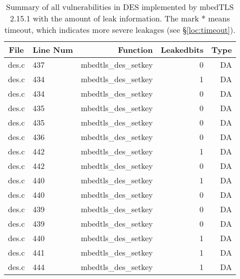 \begin{table}%
\centering\tiny\scriptsize
\caption{Summary of all vulnerabilities in DES implemented by mbedTLS 2.15.1 with the amount of leak information. The mark $*$ means timeout, which indicates more severe leakages (see \S\ref{loc:timeout}).}\label{tab:DESmbedTLS}
\begin{tabular}{clrrr}
\hline
\textbf{File} & \textbf{Line Num} & \textbf{Function} & \textbf{Leakedbits} & \textbf{Type} \\\hline
des.c& 437&mbedtls\_des\_setkey&0 &DA\\
des.c& 434&mbedtls\_des\_setkey&1 &DA\\
des.c& 434&mbedtls\_des\_setkey&0 &DA\\
des.c& 435&mbedtls\_des\_setkey&0 &DA\\
des.c& 435&mbedtls\_des\_setkey&0 &DA\\
des.c& 436&mbedtls\_des\_setkey&0 &DA\\
des.c& 442&mbedtls\_des\_setkey&1 &DA\\
des.c& 442&mbedtls\_des\_setkey&0 &DA\\
des.c& 440&mbedtls\_des\_setkey&1 &DA\\
des.c& 440&mbedtls\_des\_setkey&0 &DA\\
des.c& 439&mbedtls\_des\_setkey&0 &DA\\
des.c& 439&mbedtls\_des\_setkey&0 &DA\\
des.c& 440&mbedtls\_des\_setkey&1 &DA\\
des.c& 441&mbedtls\_des\_setkey&1 &DA\\
des.c& 444&mbedtls\_des\_setkey&1 &DA\\
\hline
\end{tabular}
\end{table}
